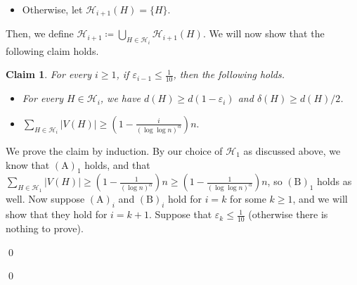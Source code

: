 \documentclass[10pt]{article}
\theoremstyle{plain}
\numberwithin{theorem}{section}
\newtheorem{claim}{Claim}[theorem]
\theoremstyle{definition}
\theoremstyle{remark}
\renewenvironment{proof}[1][]{\begin{trivlist}
\item[\hspace{\labelsep}{\bf\noindent Proof#1.\/}] }{\qed\end{trivlist}}
\newcommand{\cH}{\mathcal{H}}
\newcommand{\eps}{\varepsilon}
\theoremstyle{plain}
\begin{document}
\begin{proof}[ of Lemma~\ref{lem:expandercoverstrong}]
\begin{itemize}
		\item[$\mathrm{(b)}_i$] Otherwise, let $\cH_{i+1}(H) = \{H\}$.
	\end{itemize}

	Then, we define $\cH_{i+1} \coloneqq \bigcup_{H \in \cH_i} \cH_{i+1}(H)$. We will now show that the following claim holds.

	\begin{claim}
		\label{claim:refiningcovers}
		For every $i \ge 1$, if $\eps_{i-1} \le \frac{1}{10}$, then the following holds.
		\begin{itemize}
			\item[$\mathrm{(A)}_i$] For every $H \in \cH_{i}$, we have $d(H) \ge d(1 - \eps_{i})$ and $\delta(H) \ge d(H)/2$. 

			\item[$\mathrm{(B)}_i$] $\sum_{H \in \cH_{i}} |V(H)| \ge (1 - \frac{i}{(\log \log n)^{\alpha}})n.$
		\end{itemize}
	\end{claim}
	\begin{proof}[ of claim]
		We prove the claim by induction. By our choice of $\cH_{1}$ as discussed above, we know that $\mathrm{(A)}_1$ holds, and that $\sum_{H \in \cH_1} |V(H)| \ge (1-\frac{1}{(\log n)^{\alpha}})n \ge (1 - \frac{1}{(\log \log n)^{\alpha}})n$, so $\mathrm{(B)}_1$ holds as well. 
		Now suppose $\mathrm{(A)}_i$ and $\mathrm{(B)}_i$ hold for $i = k$ for some $k \ge 1$, and we will show that they hold for $i = k+1$. Suppose that $\eps_k \le \frac{1}{10}$ (otherwise there is nothing to prove).


\end{proof}
\end{proof}
\end{document}
